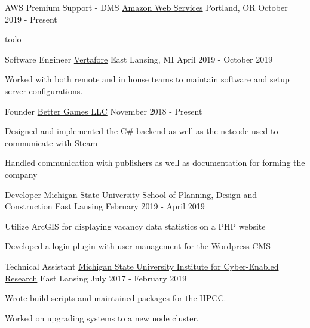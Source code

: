 
\begin{cventries}

  \cventry
    {AWS Premium Support - DMS} %
    {\href{https://aws.amazon.com}{Amazon Web Services}} %
    {Portland, OR} %
    {October 2019 - Present} %
    {
      \begin{cvitems}
        \item {todo}
      \end{cvitems}
    }

  \cventry
    {Software Engineer}
    {\href{https://www.vertafore.com}{Vertafore}}
    {East Lansing, MI}
    {April 2019 - October 2019}
    {
      \begin{cvitems}
        \item {Worked with both remote and in house teams to maintain software and setup server configurations.}
      \end{cvitems}
    }

  \cventry
    {Founder}
    {\href{https://better-games.org}{Better Games LLC}}
    {}
    {November 2018 - Present}
    {
      \begin{cvitems}
        \item {Designed and implemented the C\# backend as well as the netcode used to communicate with Steam}
        \item {Handled communication with publishers as well as documentation for forming the company}
      \end{cvitems}
    }

  \cventry
  {Developer}
  {Michigan State University School of Planning, Design and Construction}
  {East Lansing}
  {February 2019 - April 2019}
  {
    \begin{cvitems}
      \item {Utilize ArcGIS for displaying vacancy data statistics on a PHP website}
      \item {Developed a login plugin with user management for the Wordpress CMS}
    \end{cvitems}
  }

  \cventry
    {Technical Assistant}
    {\href{https://icer.msu.edu}{Michigan State University Institute for Cyber-Enabled Research}}
    {East Lansing}
    {July 2017 - February 2019}
    {
      \begin{cvitems}
        \item {Wrote build scripts and maintained packages for the HPCC.}
        \item {Worked on upgrading systems to a new node cluster.}
      \end{cvitems}
    }


\end{cventries}
